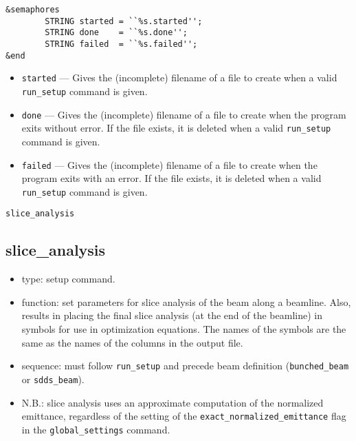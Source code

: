 \documentclass[11pt]{article}
\begin{document}
\begin{verbatim}
&semaphores
        STRING started = ``%s.started'';
        STRING done    = ``%s.done'';
        STRING failed  = ``%s.failed'';
&end
\end{verbatim}

\begin{itemize}
\item {\tt started} --- Gives the (incomplete) filename of a file to create when a valid
        {\tt run\_setup} command is given.
\item {\tt done} --- Gives the (incomplete) filename of a file to create when the program
        exits without error.  If the file exists, it is deleted when a valid {\tt run\_setup}
        command is given.
\item {\tt failed} --- Gives the (incomplete) filename of a file to create when the program
        exits with an error.  If the file exists, it is deleted when a valid {\tt run\_setup}
        command is given.
\end{itemize}

\newpage
\begin{center}{\Large\verb|slice_analysis|}\end{center}
\subsection{slice\_analysis \label{subsec:sliceanalysis}}

\begin{itemize}
\item type: setup command.
\item function: set parameters for slice analysis of the beam along a
	beamline.  Also, results in placing the final slice analysis
        (at the end of the beamline) in symbols for use in optimization
        equations.  The names of the symbols are the same as the names
        of the columns in the output file.
\item sequence: must follow \verb|run_setup| and precede beam definition (\verb|bunched_beam| or \verb|sdds_beam|).
\item N.B.: slice analysis uses an approximate computation of the normalized emittance, regardless of the
  setting of the \verb|exact_normalized_emittance| flag in the \verb|global_settings| command.
\end{itemize}
\end{document}
